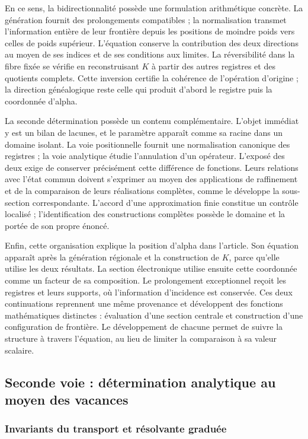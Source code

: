 En ce sens, la bidirectionnalité possède une formulation arithmétique
concrète. La génération fournit des prolongements compatibles ; la
normalisation transmet l'information entière de leur frontière depuis les
positions de moindre poids vers celles de poids supérieur. L'équation conserve la
contribution des deux directions au moyen de ses indices et de ses conditions
aux limites. La réversibilité dans la fibre fixée se vérifie en reconstruisant
$K$ à partir des autres registres et des quotients complets. Cette
inversion certifie la cohérence de l'opération d'origine ; la direction
généalogique reste celle qui produit d'abord le registre puis
la coordonnée d'alpha.

La seconde détermination possède un contenu complémentaire. L'objet
immédiat y est un bilan de lacunes, et le paramètre apparaît comme
sa racine dans un domaine isolant. La voie positionnelle fournit une
normalisation canonique des registres ; la voie analytique étudie l'annulation
d'un opérateur. L'exposé des deux exige de conserver précisément
cette différence de fonctions. Leurs relations avec l'état commun doivent
s'exprimer au moyen des applications de raffinement et de la comparaison de
leurs réalisations complètes, comme le développe la sous-section
correspondante. L'accord d'une approximation finie constitue un
contrôle localisé ; l'identification des constructions complètes
possède le domaine et la portée de son propre énoncé.

Enfin, cette organisation explique la position d'alpha dans l'article.
Son équation apparaît après la génération régionale et la construction
de $K$, parce qu'elle utilise les deux résultats. La section électronique utilise
ensuite cette coordonnée comme un facteur de sa composition. Le prolongement
exceptionnel reçoit les registres et leurs supports, où l'information
d'incidence est conservée. Ces deux continuations reprennent une même
provenance et développent des fonctions mathématiques distinctes : évaluation d'une
section centrale et construction d'une configuration de frontière.
Le développement de chacune permet de suivre la structure à travers
l'équation, au lieu de limiter la comparaison à sa valeur scalaire.



\subsection{Seconde voie : détermination analytique au moyen des vacances}
\subsubsection{Invariants du transport et résolvante graduée}
\label{x_reciprocidad:subsec:alpha-via-b}

